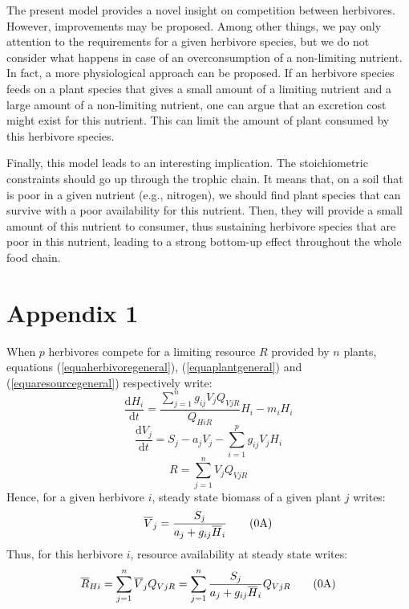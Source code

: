 \documentclass[12pt]{article}
\newcommand\equa[1]{\frac{\mathrm{d}#1}{\mathrm{d}t}}
\newcommand\barre[1]{\overline{\rule{0pt}{1.5ex}#1}}
\begin{document}
The present model provides a novel insight on competition between herbivores. However, improvements may be proposed. Among other things, we pay only attention to the requirements for a given herbivore species, but we do not consider what happens in case of an overconsumption of a non-limiting nutrient. In fact, a more physiological approach can be proposed. If an herbivore species feeds on a plant species that gives a small amount of a limiting nutrient and a large amount of a non-limiting nutrient, one can argue that an excretion cost might exist  for this nutrient. This can limit the amount of plant consumed by this herbivore species.
\par 
Finally, this model leads to an interesting implication. The stoichiometric constraints should go up through the trophic chain. It means that, on a soil that is poor in a given nutrient (e.g., nitrogen), we should find plant species that can survive with a poor availability  for this nutrient. Then, %
they will provide a small amount of this nutrient to consumer, thus sustaining herbivore species that are poor in this nutrient, leading to a strong bottom-up effect throughout the whole food chain. 

\section*{Appendix 1}
When $p$ herbivores compete for a limiting resource $R$ provided by $n$ plants, equations  (\ref{equaherbivoregeneral}), (\ref{equaplantgeneral}) and (\ref{equaresourcegeneral}) respectively write:
\begin{equation}
\equa{H_i}= \frac{\displaystyle \sum _{j=1}^{n} g_{ij}V_j  Q_{VjR}}{Q_{HiR}} H_i - m_i H_i \tag{\theequation A}
\end{equation}
\begin{equation}
\equa{V_j}=S_j-a_jV_j-\sum ^p _{i=1} g_{ij}V_jH_i \tag{\theequation A}
\end{equation}
\begin{equation}
R=\sum _{j=1}^{n} V_j Q_{VjR} \tag{\theequation A}
\end{equation}
Hence, for a given herbivore $i$, steady state biomass of a given plant $j$ writes:
\begin{equation}
\barre{V}_j= \frac{S_j}{a_j + g_{ij} \barre{H}_i} \tag{\theequation A}
\end{equation}
Thus, for this herbivore $i$, resource availability at steady state writes:
\begin{equation}
\barre{R}_{Hi}=  \sum _{j=1}^{n} \barre{V}_j Q_{VjR} = \sum _{j=1}^{n} \frac{S_j}{a_j + g_{ij} \barre{H}_i} Q_{VjR} \tag{\theequation A}
\end{equation}
\end{document}
